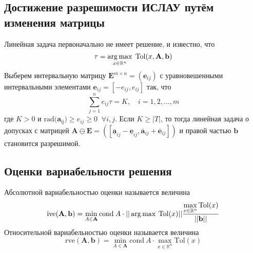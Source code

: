 \subsection{Достижение разрешимости ИСЛАУ путём изменения матрицы}
Линейная задача первоначально не имеет решение, и известно, что
\begin{equation}
\tau=\operatorname*{arg\,max}_{x\in \mathbb{R}^n} \; \mathrm{Tol}(x,\mathbf{A},\mathbf{b})
\end{equation}
Выберем интервальную матрицу $\mathbf{E}^{m\times n}=(\mathbf{e}_{ij})$ с уравновешенными интервальными элементами $\mathbf{e}_{ij}=[-e_{ij}, e_{ij}]$ так, что
\begin{equation}
    \sum_{j=1}^n e_{ij}\tau=K, \quad i=1,2,...,m
\end{equation}
где $K>0$ и $\mathrm{rad(\mathbf{a}_{ij}})\geq e_{ij} \geq 0 \;\; \forall i,j$.
Если $K\geq |T|$, то тогда линейная задача о допусках с матрицей $\mathbf{A}\ominus\mathbf{E}=([\underline{\mathbf{a}}_{ij}-\underline{\mathbf{e}}_{ij},\overline{\mathbf{a}}_{ij}+\overline{\mathbf{e}}_{ij}])$ и правой частью $\textbf{b}$ становится разрешимой.
\subsection{Оценки вариабельности решения}
Абсолютной вариабельностью оценки называется величина
\begin{equation}
    \mathrm{ive}(\mathbf{A},\mathbf{b})=\min\limits_{A\in\mathbf{A}}\mathrm{cond}\:A\cdot||\operatorname*{arg\,max}\:\mathrm{Tol}(x)||\frac{\max\limits_{x\in\mathbb{R}^n}\mathrm{Tol}(x)}{||\mathbf{b}||}
\end{equation}
Относительной вариабельностью оценки называется величина
\begin{equation}
    \mathrm{rve}(\mathbf{A},\mathbf{b})=\min\limits_{A\in\mathbf{A}}\mathrm{cond}\:A\cdot\max\limits_{x\in\mathbb{R}^n}\mathrm{Tol}(x)
\end{equation}